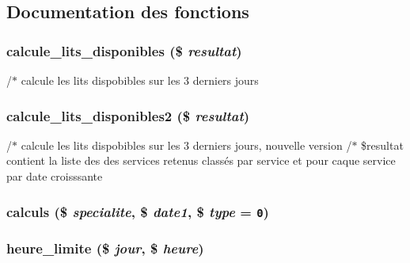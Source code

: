 \subsection{Documentation des fonctions}
\hypertarget{lits__dispo_8php_a11}{
\subsubsection[calcule\_\-lits\_\-disponibles]{\setlength{\rightskip}{0pt plus 5cm}calcule\_\-lits\_\-disponibles (\$ {\em resultat})}}
\label{lits__dispo_8php_a11}


/$\ast$ calcule les lits dispobibles sur les 3 derniers jours \hypertarget{lits__dispo_8php_a10}{
\subsubsection[calcule\_\-lits\_\-disponibles2]{\setlength{\rightskip}{0pt plus 5cm}calcule\_\-lits\_\-disponibles2 (\$ {\em resultat})}}
\label{lits__dispo_8php_a10}


/$\ast$ calcule les lits dispobibles sur les 3 derniers jours, nouvelle version /$\ast$ \$resultat contient la liste des des services retenus class\'{e}s par service et pour caque service par date croisssante \hypertarget{lits__dispo_8php_a12}{
\subsubsection[calculs]{\setlength{\rightskip}{0pt plus 5cm}calculs (\$ {\em specialite}, \$ {\em date1}, \$ {\em type} = {\tt 0})}}
\label{lits__dispo_8php_a12}


\hypertarget{lits__dispo_8php_a8}{
\subsubsection[heure\_\-limite]{\setlength{\rightskip}{0pt plus 5cm}heure\_\-limite (\$ {\em jour}, \$ {\em heure})}}
\label{lits__dispo_8php_a8}



